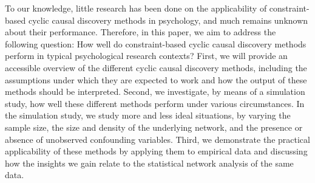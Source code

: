 \documentclass[twoside, 11pt]{article}
\begin{document}
To our knowledge, little research has been done on the applicability of constraint-based cyclic causal discovery methods in psychology, and much remains unknown about their performance.
Therefore, in this paper, we aim to address the following question: How well do constraint-based cyclic causal discovery methods perform in typical psychological research contexts? First, we will provide an accessible overview of the different cyclic causal discovery methods, including the assumptions under which they are expected to work and how the output of these methods should be interpreted. Second, we investigate, by means of a simulation study, how well these different methods perform under various circumstances. In the simulation study, we study more and less ideal situations, by varying the sample size, the size and density of the underlying network, and the presence or absence of unobserved confounding variables. Third, we demonstrate the practical applicability of these methods by applying them to empirical data \citep{mcnally_co-morbid_2017} and discussing how the insights we gain relate to the statistical network analysis of the same data.



\end{document}
